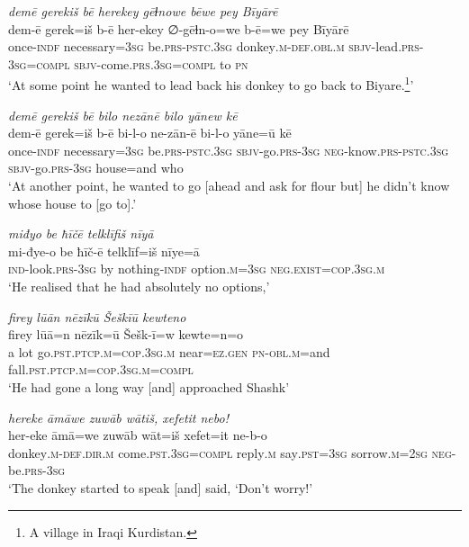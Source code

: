\ea \label{HB.25}
\textit{demē gerekiš bē herekey gēɫnowe bēwe pey Bīyārē} \\ 
\gll dem-ē gerek=iš b-ē her-ekey ∅-gēɫn-o=we b-ē=we pey Bīyārē \\ 
 once\textsc{-indf} necessary\textsc{=3sg} be\textsc{.prs}\textsc{-pstc}\textsc{.3sg} donkey\textsc{.m}\textsc{-def}\textsc{.obl}\textsc{.m} \textsc{sbjv-}lead\textsc{.prs}\textsc{-3sg}\textsc{=\textsc{compl}} \textsc{sbjv-}come\textsc{.prs}\textsc{.3sg}\textsc{=\textsc{compl}} to \textsc{pn} \\ 
\glt `At some point he wanted to lead back his donkey to go back to Biyare.\footnote{A village in Iraqi Kurdistan.}'
\z 
 
\ea \label{HB.26}
\textit{demē gerekiš bē bilo nezānē bilo yānew kē} \\ 
\gll dem-ē gerek=iš b-ē bi-l-o ne-zān-ē bi-l-o yāne=ū kē \\ 
 once\textsc{-indf} necessary\textsc{=3sg} be\textsc{.prs}\textsc{-pstc}\textsc{.3sg} \textsc{sbjv-}go\textsc{.prs}\textsc{-3sg} \textsc{neg-}know\textsc{.prs}\textsc{-pstc}\textsc{.3sg} \textsc{sbjv-}go\textsc{.prs}\textsc{-3sg} house=and who \\ 
\glt `At another point, he wanted to go [ahead and ask for flour but] he didn’t know whose house to [go to].'
\z 
 
\ea \label{HB.29}
\textit{miđyo be ħīčē telklīfiš nīyā} \\ 
\gll mi-đye-o be ħīč-ē telklīf=iš nīye=ā \\ 
 \textsc{ind-}look\textsc{.prs}\textsc{-3sg} by nothing\textsc{-indf} option\textsc{.m}\textsc{=3sg} \textsc{\textsc{neg.}exist}\textsc{=cop}\textsc{.3sg}\textsc{.m} \\ 
\glt `He realised that he had absolutely no options,'
\z 
 
\ea \label{HB.30}
\textit{firey lūān nēzīkū Šeškīū kewteno} \\ 
\gll firey lūā=n nēzīk=ū Šešk-ī=w kewte=n=o \\ 
 a lot go\textsc{.pst}\textsc{.ptcp}\textsc{.m}\textsc{=cop}\textsc{.3sg}\textsc{.m} near\textsc{=ez}\textsc{.gen} \textsc{pn}\textsc{-obl}\textsc{.m}=and fall\textsc{.pst}\textsc{.ptcp}\textsc{.m}\textsc{=cop}\textsc{.3sg}\textsc{.m}\textsc{=\textsc{compl}} \\ 
\glt `He had gone a long way [and] approached Shashk'
\z 
 
\ea \label{HB.31}
\textit{hereke āmāwe zuwāb wātiš, xefetit nebo!} \\ 
\gll her-eke āmā=we zuwāb wāt=iš xefet=it ne-b-o \\ 
 donkey\textsc{.m}\textsc{-def}\textsc{.dir}\textsc{.m} come\textsc{.pst}\textsc{.3sg}\textsc{=compl} reply\textsc{.m} say\textsc{.pst}\textsc{=3sg} sorrow\textsc{.m}\textsc{=\textsc{2sg}} \textsc{neg-}be\textsc{.prs}\textsc{-3sg} \\ 
\glt `The donkey started to speak [and] said, ‘Don’t worry!'
\z 
 
